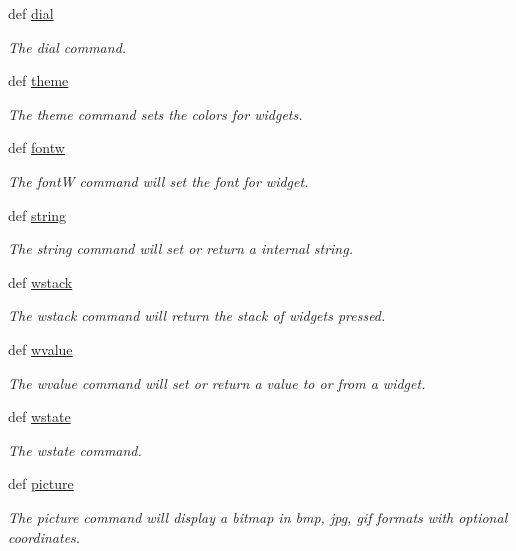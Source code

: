 \begin{DoxyCompactItemize}
def \hyperlink{group___widgets_ga8691bfb0f80929f4b4e09a83697532b8}{dial}
\begin{DoxyCompactList}\small\item\em The dial command. \end{DoxyCompactList}\item 
def \hyperlink{group___widgets_gacdc1a0697e6d5777b4d77bfc5247f0bf}{theme}
\begin{DoxyCompactList}\small\item\em The theme command sets the colors for widgets. \end{DoxyCompactList}\item 
def \hyperlink{group___widgets_gad527fa9cb9cda35802e26af7e1870f96}{fontw}
\begin{DoxyCompactList}\small\item\em The font\-W command will set the font for widget. \end{DoxyCompactList}\item 
def \hyperlink{group___widgets_ga606e61e5ba0ea6ae6ada021e7c021b39}{string}
\begin{DoxyCompactList}\small\item\em The string command will set or return a internal string. \end{DoxyCompactList}\item 
def \hyperlink{group___widgets_ga70b40969e280a9c315b84c18848309ca}{wstack}
\begin{DoxyCompactList}\small\item\em The wstack command will return the stack of widgets pressed. \end{DoxyCompactList}\item 
def \hyperlink{group___widgets_ga7eaa2fac8abbadf04fa9afb49702906a}{wvalue}
\begin{DoxyCompactList}\small\item\em The wvalue command will set or return a value to or from a widget. \end{DoxyCompactList}\item 
def \hyperlink{group___widgets_gaada0b335d54904b4f4517755ace97e47}{wstate}
\begin{DoxyCompactList}\small\item\em The wstate command. \end{DoxyCompactList}\item 
def \hyperlink{group___bitmap_font_ga3bdde0a3f8505adbfb3c4b7107da7650}{picture}
\begin{DoxyCompactList}\small\item\em The picture command will display a bitmap in bmp, jpg, gif formats with optional coordinates. \end{DoxyCompactList}\item 

\end{DoxyCompactItemize}
